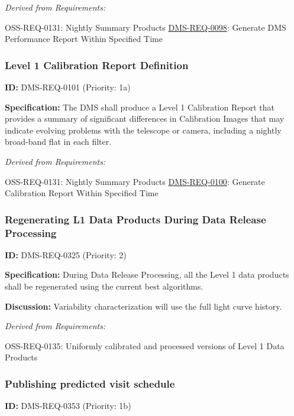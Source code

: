 \documentclass[SE,toc,lsstdraft]{lsstdoc}
\begin{document}
\emph{Derived from Requirements:}

OSS-REQ-0131:
Nightly Summary Products \newline
\hyperref[DMS-REQ-0098]{DMS-REQ-0098}:
Generate DMS Performance Report Within Specified Time \newline

\subsubsection{Level 1 Calibration Report Definition}

\label{DMS-REQ-0101}
\textbf{ID:} DMS-REQ-0101 (Priority: 1a)

\textbf{Specification:} The DMS shall produce a Level 1 Calibration Report that provides a summary of significant differences in Calibration Images that may indicate evolving problems with the telescope or camera, including a nightly broad-band flat in each filter.

\emph{Derived from Requirements:}

OSS-REQ-0131:
Nightly Summary Products \newline
\hyperref[DMS-REQ-0100]{DMS-REQ-0100}:
Generate Calibration Report Within Specified Time \newline

\subsubsection{Regenerating L1 Data Products During Data Release Processing}

\label{DMS-REQ-0325}
\textbf{ID:} DMS-REQ-0325 (Priority: 2)

\textbf{Specification:} During Data Release Processing, all the Level 1 data products shall be regenerated using the current best algorithms.

\textbf{Discussion:} Variability characterization will use the full light curve history.

\emph{Derived from Requirements:}

OSS-REQ-0135:
Uniformly calibrated and processed versions of Level 1 Data Products \newline

\subsubsection{Publishing predicted visit schedule}

\label{DMS-REQ-0353}
\textbf{ID:} DMS-REQ-0353 (Priority: 1b)
\end{document}
